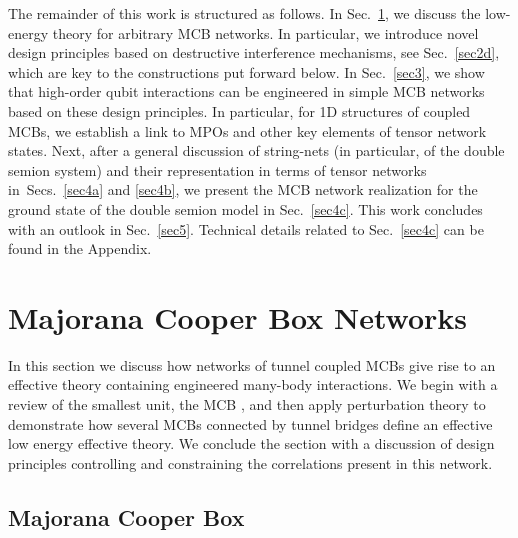 \documentclass[twocolumn,floats,prx,showpacs]{revtex4-1}
\begin{document}
The remainder of this work is structured as follows. In Sec.~\ref{sec2}, we discuss the low-energy theory for arbitrary MCB networks.  In particular, we introduce novel design principles based on destructive interference mechanisms, see Sec.~\ref{sec2d}, which are key to the constructions put forward below.  In Sec.~\ref{sec3}, we show that high-order qubit interactions can be engineered in simple MCB networks based on these design principles.  In particular, for 1D structures of coupled MCBs, we establish a link to MPOs and other key elements of tensor network states.  Next, after a general discussion of string-nets (in particular, of the double semion system) and their representation in terms of tensor networks in~Secs.~\ref{sec4a} and \ref{sec4b}, we present the MCB network realization for the ground state of the double semion model in Sec.~\ref{sec4c}.  This work concludes with an outlook in Sec.~\ref{sec5}. Technical details 
related to Sec.~\ref{sec4c} can be found in the Appendix.


\section{Majorana Cooper Box Networks}\label{sec2}

In this section we discuss how networks of tunnel coupled MCBs give rise to an effective  theory containing engineered many-body interactions. We begin with a review of the smallest unit, the MCB  \cite{Beri2012,Beri2013,Altland2013,Plugge2017,Karzig2017}, and then apply perturbation theory to demonstrate how several MCBs connected by tunnel bridges define an effective low energy effective theory. We conclude the section with a discussion of design principles controlling and constraining the correlations present in this network.

\subsection{Majorana Cooper Box}\label{sec2a}
\end{document}
